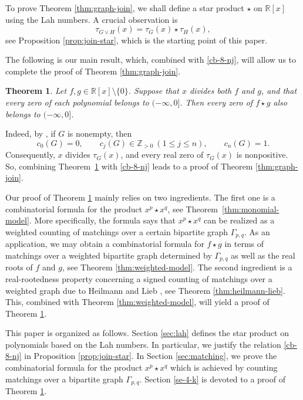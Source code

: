 \documentclass[12pt,a4paper,reqno]{amsart}
\numberwithin{equation}{section}
\newtheorem{theorem}{Theorem}[section]
\theoremstyle{definition}
\theoremstyle{remark}
\newcommand{\R}{\mathbb R}
\begin{document}
To prove Theorem \ref{thm:graph-join}, we shall define a star product $\star$ on
$\R[x]$ using the Lah numbers. A crucial observation is 
\begin{equation}\label{cb-8-nj}
 \tau_{G\vee H}(x)=\tau_G(x)\star\tau_H(x),   
\end{equation}
see  Proposition \ref{prop:join-star}, which is the starting point of this paper. 

The following is our main result, which, combined with \eqref{cb-8-nj}, will allow us to complete the proof of Theorem  \ref{thm:graph-join}. 

\begin{theorem}\label{thm:abstract-main}
Let $f,g\in\R[x]\setminus\{0\}$.  Suppose that $x$ divides both $f$ and
$g$, and that every zero of each polynomial belongs to $(-\infty,0]$.
Then every zero of $f\star g$ also belongs to $(-\infty,0]$.
\end{theorem}

Indeed, by  \cite[Corollary~5.4]{Brenti92}, if $G$ is nonempty, then
\begin{equation*}
 c_0(G)=0,\qquad c_j(G)\in\mathbb Z_{>0}\ (1\leq j\leq n),
 \qquad c_n(G)=1.
\end{equation*}
Consequently, $x$ divides $\tau_G(x)$, and every real zero of $\tau_G(x)$
is nonpositive.  So, combining Theorem~\ref{thm:abstract-main} with 
\eqref{cb-8-nj} leads to a proof of  Theorem \ref{thm:graph-join}.

Our proof of Theorem \ref{thm:abstract-main} mainly relies on two ingredients. 
The first one is a combinatorial formula for the product $x^p \star x^q$, see Theorem~\ref{thm:monomial-model}. More specifically, the formula says that $x^p \star x^q$ can be realized as a weighted counting of matchings over a certain bipartite graph $\Gamma_{p,q}$. As an application, we may obtain a combinatorial formula for $f\star g $  in terms of matchings over a weighted  bipartite graph determined by $\Gamma_{p,q}$ as well as the   real roots of $f$ and $g$, see Theorem \ref{thm:weighted-model}.   The second ingredient is a real-rootedness property concerning a signed counting of matchings over a weighted graph  due to  Heilmann and Lieb \cite{HL72}, see Theorem 
\ref{thm:heilmann-lieb}. This, combined with Theorem \ref{thm:weighted-model}, will  yield a proof of Theorem \ref{thm:abstract-main}. 

This paper is organized as follows. Section \ref{sec:lah} defines the star product on polynomials based on the Lah numbers. In particular, we justify the relation \eqref{cb-8-nj} in Proposition \ref{prop:join-star}. In Section \ref{sec:matching}, we prove the combinatorial formula for the product $x^p \star x^q$ which is achieved by   counting   matchings over a bipartite graph $\Gamma_{p,q}$. Section \ref{se-4-k} is devoted to a proof of   Theorem \ref{thm:abstract-main}. 
\end{document}
